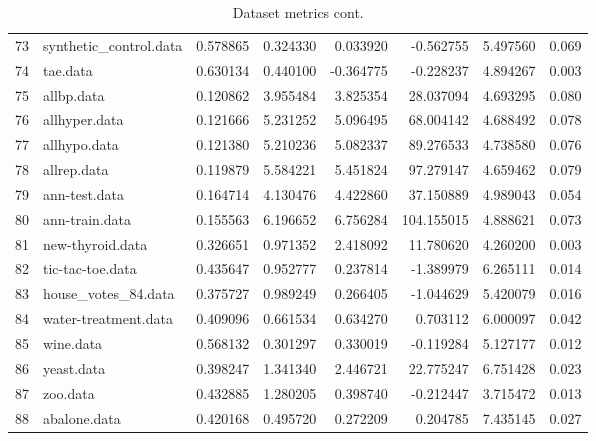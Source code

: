 \begin{table}
{\begin{tabular}{|l|l|rrrrrr|}
73 &                   synthetic\_control.data &       0.578865 &               0.324330 &   0.033920 &   -0.562755 &  5.497560 &        0.069 \\
74 &                                 tae.data &       0.630134 &               0.440100 &  -0.364775 &   -0.228237 &  4.894267 &        0.003 \\
75 &                               allbp.data &       0.120862 &               3.955484 &   3.825354 &   28.037094 &  4.693295 &        0.080 \\
76 &                            allhyper.data &       0.121666 &               5.231252 &   5.096495 &   68.004142 &  4.688492 &        0.078 \\
77 &                             allhypo.data &       0.121380 &               5.210236 &   5.082337 &   89.276533 &  4.738580 &        0.076 \\
78 &                              allrep.data &       0.119879 &               5.584221 &   5.451824 &   97.279147 &  4.659462 &        0.079 \\
79 &                            ann-test.data &       0.164714 &               4.130476 &   4.422860 &   37.150889 &  4.989043 &        0.054 \\
80 &                           ann-train.data &       0.155563 &               6.196652 &   6.756284 &  104.155015 &  4.888621 &        0.073 \\
81 &                         new-thyroid.data &       0.326651 &               0.971352 &   2.418092 &   11.780620 &  4.260200 &        0.003 \\
82 &                         tic-tac-toe.data &       0.435647 &               0.952777 &   0.237814 &   -1.389979 &  6.265111 &        0.014 \\
83 &                      house\_votes\_84.data &       0.375727 &               0.989249 &   0.266405 &   -1.044629 &  5.420079 &        0.016 \\
84 &                     water-treatment.data &       0.409096 &               0.661534 &   0.634270 &    0.703112 &  6.000097 &        0.042 \\
85 &                                wine.data &       0.568132 &               0.301297 &   0.330019 &   -0.119284 &  5.127177 &        0.012 \\
86 &                               yeast.data &       0.398247 &               1.341340 &   2.446721 &   22.775247 &  6.751428 &        0.023 \\
87 &                                 zoo.data &       0.432885 &               1.280205 &   0.398740 &   -0.212447 &  3.715472 &        0.013 \\
88  &                             abalone.data &       0.420168 &               0.495720 &   0.272209 &    0.204785 &  7.435145 &        0.027 \\
\bottomrule
\end{tabular}}
\caption{Dataset metrics cont.}
\end{table}
